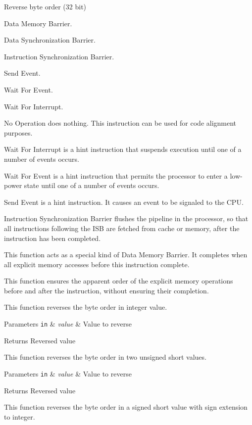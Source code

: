 Reverse byte order (32 bit)

Data Memory Barrier.

Data Synchronization Barrier.

Instruction Synchronization Barrier.

Send Event.

Wait For Event.

Wait For Interrupt.

No Operation does nothing. This instruction can be used for code alignment purposes.

Wait For Interrupt is a hint instruction that suspends execution until one of a number of events occurs.

Wait For Event is a hint instruction that permits the processor to enter a low-\/power state until one of a number of events occurs.

Send Event is a hint instruction. It causes an event to be signaled to the C\-P\-U.

Instruction Synchronization Barrier flushes the pipeline in the processor, so that all instructions following the I\-S\-B are fetched from cache or memory, after the instruction has been completed.

This function acts as a special kind of Data Memory Barrier. It completes when all explicit memory accesses before this instruction complete.

This function ensures the apparent order of the explicit memory operations before and after the instruction, without ensuring their completion.

This function reverses the byte order in integer value.


\begin{DoxyParams}[1]{Parameters}
\mbox{\tt in}  & {\em value} & Value to reverse \\
\hline
\end{DoxyParams}
\begin{DoxyReturn}{Returns}
Reversed value
\end{DoxyReturn}
This function reverses the byte order in two unsigned short values.


\begin{DoxyParams}[1]{Parameters}
\mbox{\tt in}  & {\em value} & Value to reverse \\
\hline
\end{DoxyParams}
\begin{DoxyReturn}{Returns}
Reversed value
\end{DoxyReturn}
This function reverses the byte order in a signed short value with sign extension to integer.


